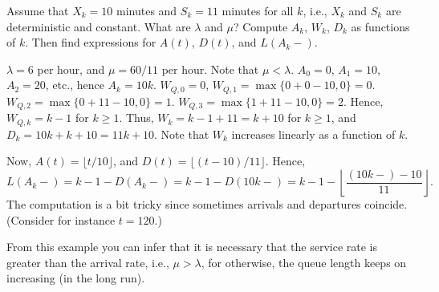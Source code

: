 \begin{extra}
 Assume that $X_k = 10$ minutes and $S_k = 11$ minutes for all
 $k$, i.e., $X_k$ and $S_k$ are deterministic and constant. What
 are $\lambda$ and $\mu$? Compute $A_k$, $W_k$, $D_k$ as functions of $k$. Then find expressions for $A(t)$, $D(t)$, and $L(A_k-)$. 
\begin{solution}
 $\lambda=6$ per hour, and $\mu=60/11$ per hour. Note that
 $\mu < \lambda$. $A_0 = 0$, $A_1=10$, $A_2=20$, etc., hence
 $A_k = 10k$. $W_{Q,0} = 0$, $W_{Q,1} = \max\{0 + 0-10,0\} = 0$.
 $W_{Q,2} = \max\{0+11-10,0\} =1$.
 $W_{Q,3} = \max\{1+11-10,0\} =2$. Hence, $W_{Q,k} = k-1$ for
 $k\geq1$. Thus, $W_k = k-1+11 = k + 10$ for $k\geq1$, and
 $D_k = 10k + k+10 = 11k+10$. Note that $W_k$ increases linearly
 as a function of $k$.

 Now, $A(t) = \lfloor t/10\rfloor$, and $D(t) = \lfloor (t-10)/11 \rfloor$. Hence,
 \begin{equation*}
 L(A_k-) = k-1 - D(A_k-) = k- 1 - D(10k-) = k- 1 - \left \lfloor \frac{(10k-)-10}{11} \right \rfloor.
 \end{equation*}
 The computation is a bit tricky since sometimes arrivals and departures coincide. (Consider for instance $t=120$.)

From this example you can infer that it is necessary that the service rate is greater than the arrival rate, i.e., $\mu > \lambda$, for otherwise, the queue length keeps on increasing (in the long run).
\end{solution}
\end{extra}


